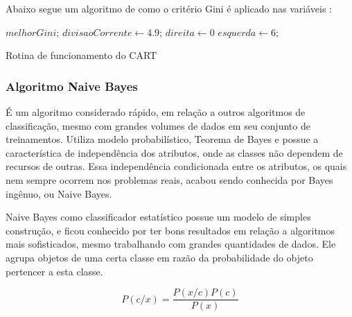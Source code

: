 Abaixo segue um algoritmo de como o critério Gini é aplicado nas variáveis \cite{Raimundo2008}:

\IncMargin{1em}
\begin{algorithm}[h]

\nl $melhorGini$; 
\nl $divisaoCorrente \leftarrow 4.9$; 
\nl $direita \leftarrow 0$\; 
\nl $esquerda \leftarrow 6$; 
\nl {}
 \caption{Rotina de funcionamento do CART}\label{alg:gini}
 
\end{algorithm}
\DecMargin{1em}


\subsubsection{Algoritmo Naive Bayes}\label{sssec:nbayes}
É um algoritmo considerado rápido, em relação a outros algoritmos de classificação, mesmo com grandes volumes de dados em seu conjunto de treinamentos. Utiliza modelo probabilístico, Teorema de Bayes e possue a característica de independência dos atributos, onde as classes não dependem de recursos de outras. Essa independência condicionada  entre os atributos, os quais nem sempre ocorrem nos problemas reais, acabou sendo conhecida por Bayes ingênuo, ou Naive Bayes.

Naive Bayes como classificador estatístico possue um modelo de simples construção, e ficou conhecido por ter bons resultados em relação a algoritmos mais sofisticados, mesmo trabalhando com grandes quantidades de dados. Ele agrupa objetos de uma certa classe em razão da probabilidade do objeto pertencer a esta classe. 

\begin{equation}
 P(c/x)= \frac{P(x/c)P(c)}{P(x)}
\end{equation}

